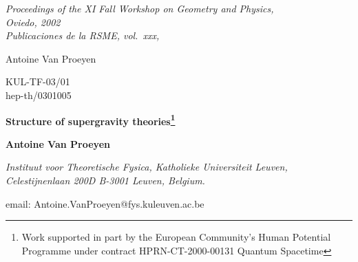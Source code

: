 \documentclass[a4paper,11pt,twoside]{article}
\begin{document}
\label{xyzt}
\leavevmode\vadjust{\vskip -50pt}

{\noindent\sl
Proceedings of the XI Fall Workshop on Geometry and Physics,\\
Oviedo, 2002\\
\rm
Publicaciones de la RSME, vol.~xxx,
}
\null\vskip 10mm


%
%

\pagestyle{myheadings} 
{{\small\sc Antoine Van Proeyen}}


%
%

\thispagestyle{empty}
\begin{flushright}
KUL-TF-03/01\\
hep-th/0301005
\end{flushright}

\begin{center}
{\Large\bf Structure of supergravity theories\footnote{Work supported in
part by the European Community's Human Potential Programme under contract
HPRN-CT-2000-00131 Quantum Spacetime} } \vskip 10mm


%
%

{\large\bf Antoine Van Proeyen } \vskip 5mm {\it
Instituut voor Theoretische Fysica, Katholieke Universiteit Leuven,\\
       Celestijnenlaan 200D B-3001 Leuven, Belgium.


\smallskip

email:  Antoine.VanProeyen@fys.kuleuven.ac.be }
\end{center}

\bigskip


%
%

\begin{abstract}
\parindent0pt\noindent
We give an elementary introduction to the structure of supergravity
theories. This leads to a table with an overview of supergravity and
supersymmetry theories in dimensions 4 to 11. The basic steps in
constructing supergravity theories are considered: determination of the
underlying algebra, the multiplets, the actions, and solutions. Finally,
an overview is given of the geometries that result from the scalars of
supergravity theories.

\bigskip
\it Key words: Supergravity, gauge theories, superalgebras, K{\"a}hler
geometry, quaternionic geometry

MSC 2000: 83E50, 53C26, 32M10, 51P05, 17B81

\end{abstract}
\end{document}
